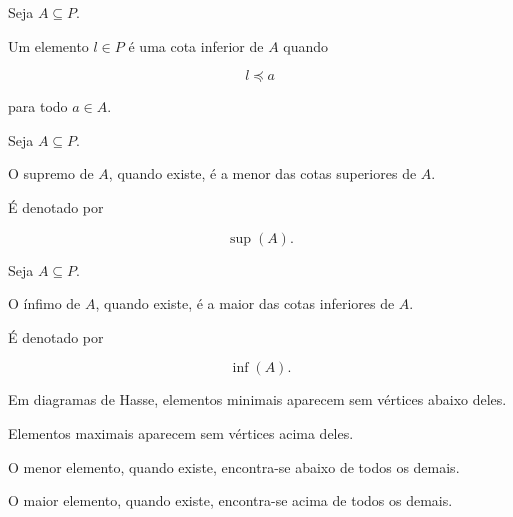 \documentclass[../../main]{subfiles}
\begin{document}
\begin{defn}
	\label{def:matematica:relacoes:diagramas-de-hasse:cota-inferior}

	Seja \(A\subseteq P\).

	Um elemento \(l\in P\) é uma cota inferior de \(A\) quando

	\[
		l\preceq a
	\]

	para todo \(a\in A\).

\end{defn}

\begin{defn}[Supremo]
	\label{def:matematica:relacoes:diagramas-de-hasse:supremo}

	Seja \(A\subseteq P\).

	O supremo de \(A\), quando existe, é a menor das cotas superiores de
	\(A\).

	É denotado por

	\[
		\sup(A).
	\]

\end{defn}

\begin{defn}[Ínfimo]
	\label{def:matematica:relacoes:diagramas-de-hasse:infimo}

	Seja \(A\subseteq P\).

	O ínfimo de \(A\), quando existe, é a maior das cotas inferiores de
	\(A\).

	É denotado por

	\[
		\inf(A).
	\]

\end{defn}

\begin{obs}

	Em diagramas de Hasse, elementos minimais aparecem sem vértices abaixo
	deles.

	Elementos maximais aparecem sem vértices acima deles.

	O menor elemento, quando existe, encontra-se abaixo de todos os
	demais.

	O maior elemento, quando existe, encontra-se acima de todos os demais.

\end{obs}
\end{document}
